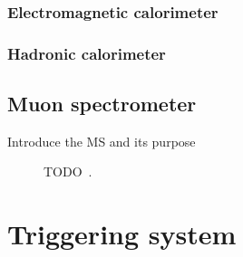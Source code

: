 \FloatBarrier
\subsubsection{Electromagnetic calorimeter} 

\FloatBarrier
\subsubsection{Hadronic calorimeter} 

\FloatBarrier
\subsection{Muon spectrometer} 

{\color{red} Introduce the MS and its purpose}

\begin{figure}[ht]
  \caption{{\color{red}TODO}~\cite{Pequenao:1095929}.}
  \label{fig:ms_cartoon}
\end{figure}


\FloatBarrier
\section{Triggering system}


